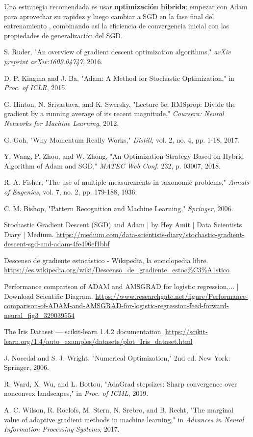 \documentclass[12pt, spanish]{article}
\begin{document}
Una estrategia recomendada es usar \textbf{optimización híbrida}: empezar con Adam para aprovechar su rapidez y luego cambiar a SGD en la fase final del entrenamiento \cite{ref5}, combinando así la eficiencia de convergencia inicial con las propiedades de generalización del SGD.

\begin{thebibliography}{99}
S. Ruder, "An overview of gradient descent optimization algorithms," \textit{arXiv preprint arXiv:1609.04747}, 2016.

D. P. Kingma and J. Ba, "Adam: A Method for Stochastic Optimization," in \textit{Proc. of ICLR}, 2015.

G. Hinton, N. Srivastava, and K. Swersky, "Lecture 6e: RMSprop: Divide the gradient by a running average of its recent magnitude," \textit{Coursera: Neural Networks for Machine Learning}, 2012.

G. Goh, "Why Momentum Really Works," \textit{Distill}, vol. 2, no. 4, pp. 1-18, 2017.

Y. Wang, P. Zhou, and W. Zhong, "An Optimization Strategy Based on Hybrid Algorithm of Adam and SGD," \textit{MATEC Web Conf.} 232, p. 03007, 2018.

R. A. Fisher, "The use of multiple measurements in taxonomic problems," \textit{Annals of Eugenics}, vol. 7, no. 2, pp. 179-188, 1936.

C. M. Bishop, "Pattern Recognition and Machine Learning," \textit{Springer}, 2006.

Stochastic Gradient Descent (SGD) and Adam | by Hey Amit | Data Scientists Diary | Medium. \url{https://medium.com/data-scientists-diary/stochastic-gradient-descent-sgd-and-adam-4fe496ef1bbf}

Descenso de gradiente estocástico - Wikipedia, la enciclopedia libre. \url{https://es.wikipedia.org/wiki/Descenso_de_gradiente_estoc\%C3\%A1stico}

Performance comparison of ADAM and AMSGRAD for logistic regression,... | Download Scientific Diagram. \url{https://www.researchgate.net/figure/Performance-comparison-of-ADAM-and-AMSGRAD-for-logistic-regression-feed-forward-neural_fig3_329039554}

The Iris Dataset — scikit-learn 1.4.2 documentation. \url{https://scikit-learn.org/1.4/auto_examples/datasets/plot_Iris_dataset.html}

J. Nocedal and S. J. Wright, "Numerical Optimization," 2nd ed. New York: Springer, 2006.

R. Ward, X. Wu, and L. Bottou, "AdaGrad stepsizes: Sharp convergence over nonconvex landscapes," in \textit{Proc. of ICML}, 2019.

A. C. Wilson, R. Roelofs, M. Stern, N. Srebro, and B. Recht, "The marginal value of adaptive gradient methods in machine learning," in \textit{Advances in Neural Information Processing Systems}, 2017.
\end{thebibliography}
\end{document}
